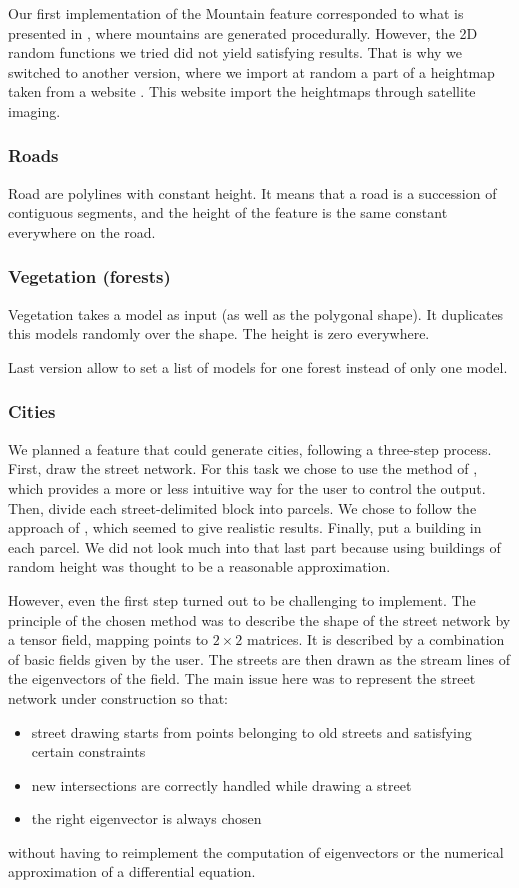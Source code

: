 Our first implementation of the Mountain feature corresponded to what
is presented in \cite{FeatureTree}, where mountains are generated
procedurally. However, the 2D random functions we tried did not yield
satisfying results. That is why we switched to another version, where
we import at random a part of a heightmap taken from a website
\cite{terrain-party}. This website import the heightmaps through
satellite imaging.


\subsubsection{Roads}
Road are polylines with constant height. It means that a road is a succession of contiguous segments, and the height of the feature is the same constant everywhere on the road. 


\subsubsection{Vegetation (forests)}
Vegetation takes a model as input (as well as the polygonal shape). It duplicates this models randomly over the shape. The height is zero everywhere.

Last version allow to set a list of models for one forest instead of only one model.


\subsubsection{Cities}

We planned a feature that could generate cities, following a
three-step process. First, draw the street network. For this task we
chose to use the method of \cite{StreetTensors}, which provides a more
or less intuitive way for the user to control the output. Then, divide
each street-delimited block into parcels. We chose to follow the
approach of \cite{PGParcels}, which seemed to give realistic
results. Finally, put a building in each parcel. We did not look much
into that last part because using buildings of random height was
thought to be a reasonable approximation.

However, even the first step turned out to be challenging to
implement. The principle of the chosen method was to describe the
shape of the street network by a tensor field, mapping points to $2
\times 2$ matrices. It is described by a combination of basic fields
given by the user. The streets are then drawn as the stream lines of
the eigenvectors of the field. The main issue here was to represent
the street network under construction so that:
\begin{itemize}
  \item street drawing starts from points belonging to old streets and
satisfying certain constraints
  \item new intersections are correctly handled while drawing a street
  \item the right eigenvector is always chosen
\end{itemize} without having to reimplement the computation of
eigenvectors or the numerical approximation of a differential
equation.

